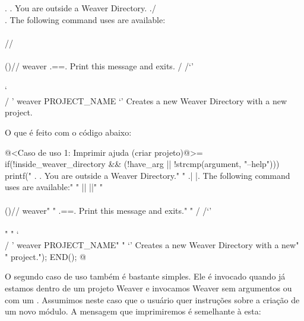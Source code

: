 {\alinhaverbatim
    .  .   You are outside a Weaver Directory.
   ./  \\.  The following command uses are available:
   \\\\  //
   \\\\()//  weaver
   .={}=.      Print this message and exits.
  / /`'\\ \\
  ` \\  / '  weaver PROJECT_NAME
     `'        Creates a new Weaver Directory with a new
               project.
\alinhanormal

O que é feito com o código abaixo:


\iniciocodigo
@<Caso de uso 1: Imprimir ajuda (criar projeto)@>=
if(!inside_weaver_directory && (!have_arg || !strcmp(argument, "--help"))){
  printf("    .  .     You are outside a Weaver Directory.\n"
  "   .|  |.    The following command uses are available:\n"
  "   ||  ||\n"
  "   \\\\()//  weaver\n"
  "   .={}=.      Print this message and exits.\n"
  "  / /`'\\ \\\n"
  "  ` \\  / '  weaver PROJECT_NAME\n"
  "     `'        Creates a new Weaver Directory with a new\n"
  "               project.\n");
  END();
}
@
\fimcodigo



O segundo caso de uso também é bastante simples. Ele é invocado quando
já estamos dentro de um projeto Weaver e invocamos Weaver sem
argumentos ou com um . Assumimos neste caso que o
usuário quer instruções sobre a criação de um novo módulo. A mensagem
que imprimiremos é semelhante à esta:

}
